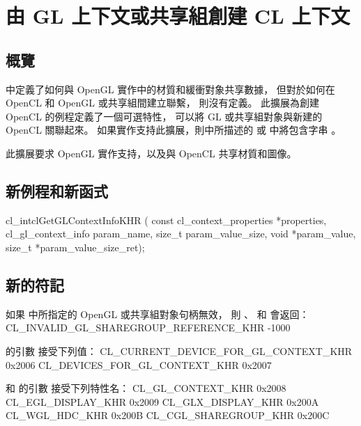 \section{由 GL 上下文或共享組創建 CL 上下文}

\subsection{概覽}

\insection[clShareGl]中定義了如何與 OpenGL 實作中的材質和緩衝對象共享數據，
但對於如何在 OpenCL 和 OpenGL 或共享組間建立聯繫，
則沒有定義。
此擴展為創建 OpenCL 的例程定義了一個可選特性，
可以將 GL 或共享組對象與新建的 OpenCL 關聯起來。
如果實作支持此擴展，則中所描述的  或
 中將包含字串 。

此擴展要求 OpenGL 實作支持，以及與 OpenCL 共享材質和圖像。

\subsection{新例程和新函式}

\startclc
cl_intclGetGLContextInfoKHR (
		const cl_context_properties *properties,
		cl_gl_context_info param_name,
		size_t param_value_size,
		void *param_value,
		size_t *param_value_size_ret);
\stopclc

\subsection{新的符記}

如果  中所指定的 OpenGL 或共享組對象句柄無效，
則 、  和  會返回：
\startclc
CL_INVALID_GL_SHAREGROUP_REFERENCE_KHR		-1000
\stopclc

 的引數  接受下列值：
\startclc
CL_CURRENT_DEVICE_FOR_GL_CONTEXT_KHR		0x2006
CL_DEVICES_FOR_GL_CONTEXT_KHR			0x2007
\stopclc

 和  的引數  接受下列特性名：
\startclc
CL_GL_CONTEXT_KHR	0x2008
CL_EGL_DISPLAY_KHR	0x2009
CL_GLX_DISPLAY_KHR	0x200A
CL_WGL_HDC_KHR		0x200B
CL_CGL_SHAREGROUP_KHR	0x200C
\stopclc

